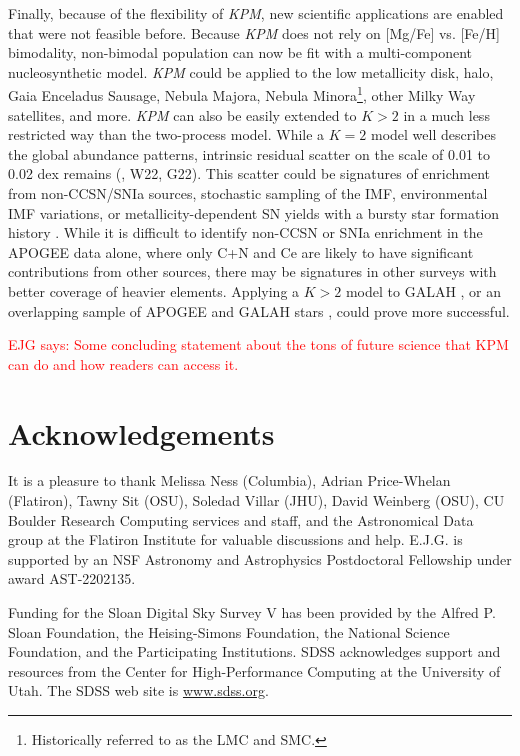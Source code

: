 \documentclass[modern]{aastex631}
\newcommand{\ejg}[1]{\textcolor{red}{EJG says: #1}}
\newcommand{\name}{\textsl{KPM}}
\begin{document}
Finally, because of the flexibility of \name{}, new scientific applications are enabled that were not feasible before. Because \name{} does not rely on [Mg/Fe] vs. [Fe/H] bimodality, non-bimodal population can now be fit with a multi-component nucleosynthetic model. \name{} could be applied to the low metallicity disk, halo, Gaia Enceladus Sausage, Nebula Majora, Nebula Minora\footnote{Historically referred to as the LMC and SMC.}, other Milky Way satellites, and more. \name{} can also be easily extended to $K>2$ in a much less restricted way than the two-process model. While a $K=2$ model well describes the global abundance patterns, intrinsic residual scatter on the scale of 0.01 to 0.02 dex remains (\citealp{ting2022}, W22, G22). This scatter could be signatures of enrichment from non-CCSN/SNIa sources, stochastic sampling of the IMF, environmental IMF variations, or metallicity-dependent SN yields with a bursty star formation history \citep[e.g.][]{belokurov2022, griffith2023}. While it is difficult to identify non-CCSN or SNIa enrichment in the APOGEE data alone, where only C+N and Ce are likely to have significant contributions from other sources, there may be signatures in other surveys with better coverage of heavier elements. Applying a $K>2$ model to GALAH \citep{buder2021}, or an overlapping sample of APOGEE and GALAH stars \citep{nandakumar2022}, could prove more successful.

\ejg{Some concluding statement about the tons of future science that KPM can do and how readers can access it.}

\section{Acknowledgements}
It is a pleasure to thank
  Melissa Ness (Columbia),
  Adrian Price-Whelan (Flatiron),
  Tawny Sit (OSU),
  Soledad Villar (JHU),
  David Weinberg (OSU),
  CU Boulder Research Computing services and staff,
  and the Astronomical Data group at the Flatiron Institute
for valuable discussions and help.
E.J.G. is supported by an NSF Astronomy and Astrophysics Postdoctoral Fellowship under award AST-2202135.

Funding for the Sloan Digital Sky Survey V has been provided by the Alfred P. Sloan Foundation, the Heising-Simons Foundation, the National Science Foundation, and the Participating Institutions. SDSS acknowledges support and resources from the Center for High-Performance Computing at the University of Utah. The SDSS web site is \url{www.sdss.org}.
\end{document}
